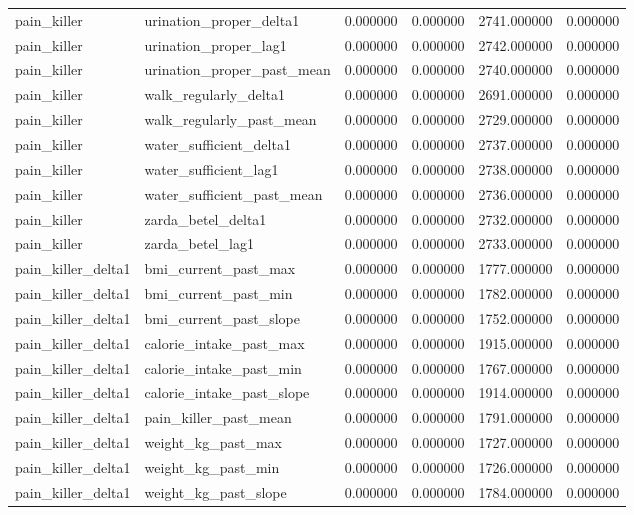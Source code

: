 \begin{longtable}{llrrrr}
pain\_killer & urination\_proper\_delta1 & 0.000000 & 0.000000 & 2741.000000 & 0.000000 \\
pain\_killer & urination\_proper\_lag1 & 0.000000 & 0.000000 & 2742.000000 & 0.000000 \\
pain\_killer & urination\_proper\_past\_mean & 0.000000 & 0.000000 & 2740.000000 & 0.000000 \\
pain\_killer & walk\_regularly\_delta1 & 0.000000 & 0.000000 & 2691.000000 & 0.000000 \\
pain\_killer & walk\_regularly\_past\_mean & 0.000000 & 0.000000 & 2729.000000 & 0.000000 \\
pain\_killer & water\_sufficient\_delta1 & 0.000000 & 0.000000 & 2737.000000 & 0.000000 \\
pain\_killer & water\_sufficient\_lag1 & 0.000000 & 0.000000 & 2738.000000 & 0.000000 \\
pain\_killer & water\_sufficient\_past\_mean & 0.000000 & 0.000000 & 2736.000000 & 0.000000 \\
pain\_killer & zarda\_betel\_delta1 & 0.000000 & 0.000000 & 2732.000000 & 0.000000 \\
pain\_killer & zarda\_betel\_lag1 & 0.000000 & 0.000000 & 2733.000000 & 0.000000 \\
pain\_killer\_delta1 & bmi\_current\_past\_max & 0.000000 & 0.000000 & 1777.000000 & 0.000000 \\
pain\_killer\_delta1 & bmi\_current\_past\_min & 0.000000 & 0.000000 & 1782.000000 & 0.000000 \\
pain\_killer\_delta1 & bmi\_current\_past\_slope & 0.000000 & 0.000000 & 1752.000000 & 0.000000 \\
pain\_killer\_delta1 & calorie\_intake\_past\_max & 0.000000 & 0.000000 & 1915.000000 & 0.000000 \\
pain\_killer\_delta1 & calorie\_intake\_past\_min & 0.000000 & 0.000000 & 1767.000000 & 0.000000 \\
pain\_killer\_delta1 & calorie\_intake\_past\_slope & 0.000000 & 0.000000 & 1914.000000 & 0.000000 \\
pain\_killer\_delta1 & pain\_killer\_past\_mean & 0.000000 & 0.000000 & 1791.000000 & 0.000000 \\
pain\_killer\_delta1 & weight\_kg\_past\_max & 0.000000 & 0.000000 & 1727.000000 & 0.000000 \\
pain\_killer\_delta1 & weight\_kg\_past\_min & 0.000000 & 0.000000 & 1726.000000 & 0.000000 \\
pain\_killer\_delta1 & weight\_kg\_past\_slope & 0.000000 & 0.000000 & 1784.000000 & 0.000000 \\

\end{longtable}
